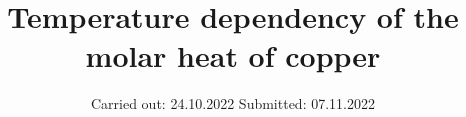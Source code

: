 

\subject{V47}
\title{Temperature dependency of the molar heat of copper}
\date{%
  Carried out: 24.10.2022
  \hspace{3em}
  Submitted: 07.11.2022
}



\maketitle
\thispagestyle{empty}
\tableofcontents
\newpage






%

\printbibliography{}


